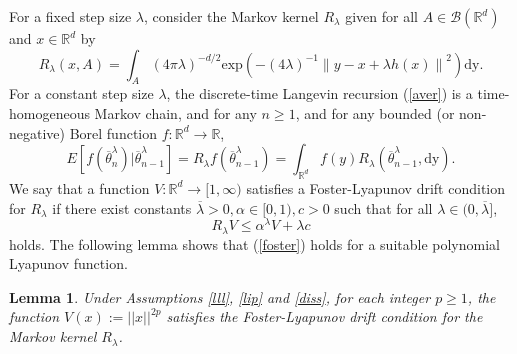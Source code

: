 \documentclass[a4paper]{article}
\newtheorem{lemma}[theorem]{Lemma}
\begin{document}
For a fixed step size $\lambda$, consider the Markov kernel $R_{\lambda}$ given for all $A \in \mathcal{B}(\mathbb{R}^d)$ and $x \in \mathbb{R}^d$ by
\begin{equation}\label{kernel_aver}
R_{\lambda}(x,A) = \int_{A}{ (4\pi \lambda)^{-d/2} \text{exp}\left(-(4\lambda)^{-1}\left\|y-x + \lambda  h(x) \right\|^2  \right)\mathrm{dy}.}
\end{equation}
For a constant step size $\lambda$, the discrete-time Langevin recursion (\ref{aver}) is a time-homogeneous Markov chain, and for any $n\ge 1$, and for any bounded
(or non-negative) Borel function $f:\mathbb{R}^d\to\mathbb{R}$,
$$E[f(\overline{\theta}^{\lambda}_n)|\overline{\theta}^{\lambda}_{n-1}] = R_{\lambda}f(\overline{\theta}^{\lambda}_{n-1}) = \int_{\mathbb{R}^d}{f(y)R_{\lambda}(\overline{\theta}^{\lambda}_{n-1},\mathrm{dy})}.$$
We say that a function $V:\mathbb{R}^d \to [1, \infty)$ satisfies a Foster-Lyapunov drift condition for $R_{\lambda}$ if there exist constants $\overline{\lambda} >0, \alpha \in [0,1), c>0$ such that for all $\lambda \in (0,\overline{\lambda}]$,
\begin{equation}\label{foster}
R_{\lambda}V \le \alpha^{\lambda} V + \lambda c
\end{equation}
holds. The following lemma shows that (\ref{foster}) holds for a suitable polynomial Lyapunov function.
\begin{lemma}\label{lem_foster}Under Assumptions \ref{lll}, \ref{lip} and \ref{diss},
for each integer $p\geq 1$, the function
$V(x):=||x||^{2p}$
satisfies the Foster-Lyapunov drift condition for the Markov kernel $R_{\lambda}$.
\end{lemma}
\end{document}
